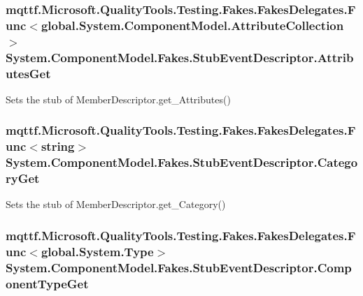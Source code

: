 \hypertarget{class_system_1_1_component_model_1_1_fakes_1_1_stub_event_descriptor_a2dde32e0494851d326b2499fe969ee70}{
\subsubsection[{Attributes\-Get}]{\setlength{\rightskip}{0pt plus 5cm}mqttf.\-Microsoft.\-Quality\-Tools.\-Testing.\-Fakes.\-Fakes\-Delegates.\-Func$<$global.\-System.\-Component\-Model.\-Attribute\-Collection$>$ System.\-Component\-Model.\-Fakes.\-Stub\-Event\-Descriptor.\-Attributes\-Get}}\label{class_system_1_1_component_model_1_1_fakes_1_1_stub_event_descriptor_a2dde32e0494851d326b2499fe969ee70}


Sets the stub of Member\-Descriptor.\-get\-\_\-\-Attributes()

\hypertarget{class_system_1_1_component_model_1_1_fakes_1_1_stub_event_descriptor_af9f80fec9302d68930a35422ebfa9b64}{
\subsubsection[{Category\-Get}]{\setlength{\rightskip}{0pt plus 5cm}mqttf.\-Microsoft.\-Quality\-Tools.\-Testing.\-Fakes.\-Fakes\-Delegates.\-Func$<$string$>$ System.\-Component\-Model.\-Fakes.\-Stub\-Event\-Descriptor.\-Category\-Get}}\label{class_system_1_1_component_model_1_1_fakes_1_1_stub_event_descriptor_af9f80fec9302d68930a35422ebfa9b64}


Sets the stub of Member\-Descriptor.\-get\-\_\-\-Category()

\hypertarget{class_system_1_1_component_model_1_1_fakes_1_1_stub_event_descriptor_a00849534b46db31f173ad767314e06dc}{
\subsubsection[{Component\-Type\-Get}]{\setlength{\rightskip}{0pt plus 5cm}mqttf.\-Microsoft.\-Quality\-Tools.\-Testing.\-Fakes.\-Fakes\-Delegates.\-Func$<$global.\-System.\-Type$>$ System.\-Component\-Model.\-Fakes.\-Stub\-Event\-Descriptor.\-Component\-Type\-Get}}\label{class_system_1_1_component_model_1_1_fakes_1_1_stub_event_descriptor_a00849534b46db31f173ad767314e06dc}


